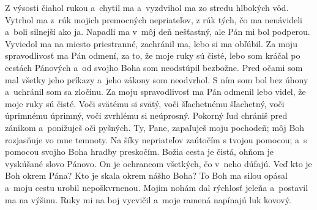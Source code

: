 Z výsosti čiahol rukou a~chytil ma
a~vyzdvihol ma zo stredu hlbokých vôd.
\versseparator
Vytrhol ma z~rúk mojich premocných nepriateľov,
z rúk tých, čo ma nenávideli
a~boli silnejší ako ja.
\versseparator
Napadli ma v~môj deň nešťastný,
ale Pán mi bol podperou.
\versseparator
Vyviedol ma na miesto priestranné,
zachránil ma, lebo si ma obľúbil.
\versseparator
Za moju spravodlivosť ma Pán odmení,
za to, že moje ruky sú čisté,
\versseparator
lebo som kráčal po cestách Pánových
a~od svojho Boha som neodstúpil bezbožne.
\versseparator
Pred očami som mal všetky jeho príkazy
a~jeho zákony som neodvrhol.
\versseparator
S ním som bol bez úhony
a~uchránil som sa zločinu.
\versseparator
Za moju spravodlivosť ma Pán odmenil
lebo videl, že moje ruky sú čisté.
\versseparator
Voči svätému si svätý,
voči šľachetnému šľachetný,
\versseparator
voči úprimnému úprimný,
voči zvrhlému si neúprosný.
\versseparator
Pokorný ľud chrániš pred zánikom
a~ponižuješ oči pyšných.
\versseparator
Ty, Pane, zapaľuješ moju pochodeň;
môj Boh rozjasňuje vo mne temnoty.
\versseparator
Na šíky nepriateľov zaútočím s tvojou pomocou;
a~s pomocou svojho Boha hradby preskočím.
\versseparator
Božia cesta je čistá,
ohňom je vyskúšané slovo Pánovo.
On je ochrancom všetkých, čo v~neho dúfajú.
\versseparator
Veď kto je Boh okrem Pána?
Kto je skala okrem nášho Boha?
\versseparator
To Boh ma silou opásal
a~moju cestu urobil nepoškvrnenou.
\versseparator
Mojim nohám dal rýchlosť jeleňa
a~postavil ma na výšinu.
\versseparator
Ruky mi na boj vycvičil
a~moje ramená napínajú luk kovový.